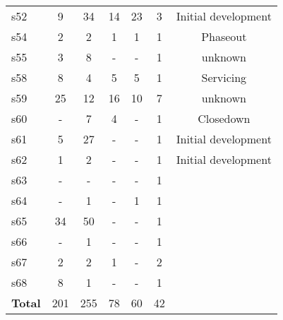 \begin{longtable}{| l | c c | c c c | c |}
s52 &
  9 &
  34 &
  14 &
  23 &
  3 &
  Initial development \\
s54 &
  2 &
  2 &
  1 &
  1 &
  1 &
  Phaseout \\
s55 &
  3 &
  8 &
  - &
  - &
  1 &
  unknown \\
s58 &
  8 &
  4 &
  5 &
  5 &
  1 &
  Servicing \\
s59 &
  25 &
  12 &
  16 &
  10 &
  7 &
  unknown \\
s60 &
  - &
  7 &
  4 &
  - &
  1 &
  Closedown \\
s61 &
  5 &
  27 &
  - &
  - &
  1 &
  Initial development \\
s62 &
  1 &
  2 &
  - &
  - &
  1 &
  Initial development \\
s63 &
  - &
  - &
  - &
  - &
  1 &
   \\
s64 &
  - &
  1 &
  - &
  1 &
  1 &
   \\
s65 &
  34 &
  50 &
  - &
  - &
  1 &
   \\
s66 &
  - &
  1 &
  - &
  - &
  1 &
   \\
s67 &
  2 &
  2 &
  1 &
  - &
  2 &
   \\
s68 &
  8 &
  1 &
  - &
  - &
  1 &
   \\
  \hline
{\bf Total} &
  201 &
  255 &
  78 &
  60 &
  42 &
     \\
  \hline
\end{longtable}
